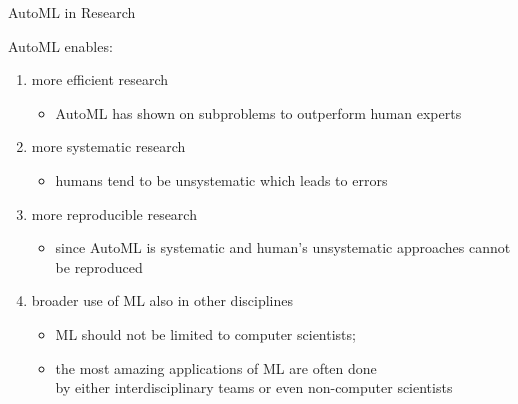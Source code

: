 \begin{frame}[c]{AutoML in Research}

AutoML enables:

\begin{enumerate}
  \item more efficient research
  \begin{itemize}
    \item AutoML has shown on subproblems to outperform human experts
  \end{itemize}
  \pause
  \smallskip
  \item more systematic research
  \begin{itemize}
    \item humans tend to be unsystematic which leads to errors
  \end{itemize}
  \smallskip
  \pause
  \item more reproducible research
  \begin{itemize}
    \item since AutoML is systematic and human's unsystematic approaches cannot be reproduced 
  \end{itemize}
  \pause
  \item broader use of ML also in other disciplines
  \begin{itemize}
    \item ML should not be limited to computer scientists;
    \item the most amazing applications of ML are often done\\ by either interdisciplinary teams or even non-computer scientists
  \end{itemize}
\end{enumerate}

\end{frame}
